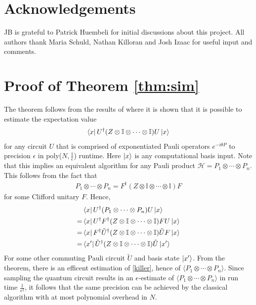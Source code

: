 \documentclass[twocolumn]{revtex4-2}
\begin{document}
\section{Acknowledgements}
JB is grateful to Patrick Huembeli for initial discussions about this project. All authors thank Maria Schuld, Nathan Killoran and Josh Izaac for useful input and comments.






\appendix


\section{Proof of Theorem \ref{thm:sim}}\label{app:simproof}
The theorem follows from the results of \cite{ni2012commuting} where it is shown that it is possible to estimate the expectation value 
\begin{align}
    \bra{x}U^{\dagger}(Z\otimes\mathbb{I}\otimes\cdots\otimes\mathbb{I})U\ket{x}
\end{align}
for any circuit $U$ that is comprised of exponentiated Pauli operators $e^{-i\theta P}$  to precision $\epsilon$ in poly($N,\frac{1}{\epsilon}$) runtime. Here $\ket{x}$ is any computational basis input. Note that this implies an equivalent algorithm for any Pauli product $\mathcal{H}=P_1\otimes\cdots\otimes P_n$. This follows from the fact that 
\begin{align}
    P_1\otimes\cdots\otimes P_n = F^\dagger(Z\otimes\mathbb{I}\otimes\cdots\otimes\mathbb{I})F
\end{align}
for some Clifford unitary $F$. Hence, 
\begin{align}
    &\bra{x}U^{\dagger}(P_1\otimes\cdots\otimes P_n)U\ket{x}\\ =& \bra{x}U^{\dagger}F^\dagger(Z\otimes\mathbb{I}\otimes\cdots\otimes\mathbb{I})FU\ket{x} \\
    =& \bra{x}F^\dagger \tilde{U}^{\dagger}(Z\otimes\mathbb{I}\otimes\cdots\otimes\mathbb{I})\tilde{U}F\ket{x}
    \\ =&\bra{x'} \tilde{U}^{\dagger}(Z\otimes\mathbb{I}\otimes\cdots\otimes\mathbb{I})\tilde{U}\ket{x'} \label{killer}
\end{align}
For some other commuting Pauli circuit $\tilde{U}$ and basis state $\ket{x'}$. From the theorem, there is an efficent estimation of \eqref{killer}, hence of $\langle P_1\otimes\cdots\otimes P_n\rangle$. Since sampling the quantum circuit results in an $\epsilon$-estimate of $\langle P_1\otimes\cdots\otimes P_n\rangle$ in run time $\frac{1}{\epsilon^2}$, it follows that the same precision can be achieved by the classical algorithm with at most polynomial overhead in $N$. 
\end{document}
